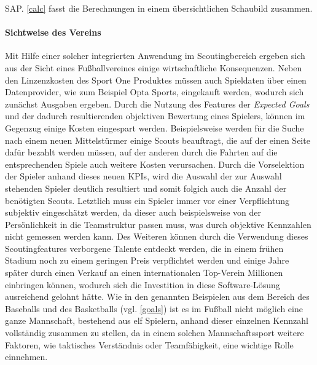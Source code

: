 SAP. \vref{calc} fasst die Berechnungen in einem übersichtlichen Schaubild zusammen.




\paragraph{Sichtweise des Vereins}
Mit Hilfe einer solcher integrierten Anwendung im Scoutingbereich ergeben sich aus der Sicht eines Fußballvereines einige wirtschaftliche Konsequenzen. Neben den Linzenzkosten des Sport One Produktes müssen auch Spieldaten über einen Datenprovider, wie zum Beispiel Opta Sports, eingekauft werden, wodurch sich zunächst Ausgaben ergeben. Durch die Nutzung des Features der \textit{Expected Goals} und der dadurch resultierenden objektiven Bewertung eines Spielers, können im Gegenzug einige Kosten eingespart werden. Beispielsweise werden für die Suche nach einem neuen Mittelstürmer einige Scouts beauftragt, die auf der einen Seite dafür bezahlt werden müssen, auf der anderen durch die Fahrten auf die entsprechenden Spiele auch weitere Kosten verursachen. Durch die Vorselektion der Spieler anhand dieses neuen KPIs, wird die Auswahl der zur Auswahl stehenden Spieler deutlich resultiert und somit folgich auch die Anzahl der benötigten Scouts. Letztlich muss ein Spieler immer vor einer Verpflichtung subjektiv eingeschätzt werden, da dieser auch beispielsweise von der Persönlichkeit in die Teamstruktur passen muss, was durch objektive Kennzahlen nicht gemessen werden kann. Des Weiteren können durch die Verwendung dieses Scoutingfeatures verborgene Talente entdeckt werden, die in einem frühen Stadium noch zu einem geringen Preis verpflichtet werden und einige Jahre später durch einen Verkauf an einen internationalen Top-Verein Millionen einbringen können, wodurch sich die Investition in diese Software-Lösung ausreichend gelohnt hätte. Wie in den genannten Beispielen aus dem Bereich des Baseballs und des Basketballs (vgl. \vref{goals}) ist es im Fußball nicht möglich eine ganze Mannschaft, bestehend aus elf Spielern, anhand dieser einzelnen Kennzahl vollständig zusammen zu stellen, da in einem solchen Mannschaftssport weitere Faktoren, wie taktisches Verständnis oder Teamfähigkeit, eine wichtige Rolle einnehmen. 